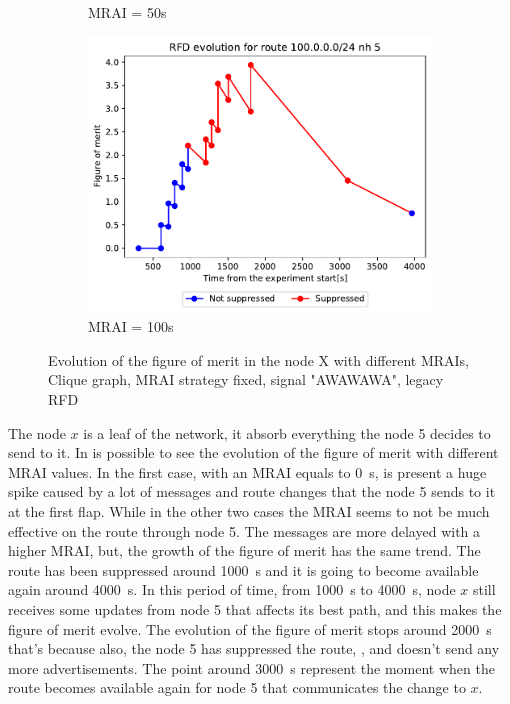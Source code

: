 \begin{figure}[h]
\begin{subfigure}[b]{0.49\textwidth}
         \caption{MRAI = 50s}
         \label{fig:clique_x_mrai50}
     \end{subfigure}
     \begin{subfigure}[b]{0.49\textwidth}
         \centering
         \includegraphics[width=\textwidth]{images/RFD/clique/FigureOfMerit/mrai21_RFD_x_rfd_R1.pdf}
         \caption{MRAI = 100s}
         \label{fig:clique_x_mrai100}
     \end{subfigure}
        \caption{Evolution of the figure of merit in the node X with different MRAIs,
		Clique graph, MRAI strategy fixed, signal "AWAWAWA", legacy RFD}
        \label{fig:clique_nodex}
\end{figure}

The node $x$ is a leaf of the network, it absorb everything the node \num{5} decides
to send to it.
In  is possible to see the evolution of the figure of merit
with different \ac{MRAI} values.
In the first case, with an \ac{MRAI} equals to \SI{0}{\second}, is present a huge
spike caused by a lot of messages and route changes that the node \num{5} sends
to it at the first flap.
While in the other two cases 
the \ac{MRAI} seems to not be much effective on the route through node \num{5}.
The messages are more delayed with a higher \ac{MRAI}, but, the growth of the figure
of merit has the same trend.
The route has been suppressed around \SI{1000}{\second}
and it is going to become available again around \SI{4000}{\second}.
In this period of time, from \SI{1000}{\second} to \SI{4000}{\second}, node $x$ still
receives some updates from node \num{5} that affects its best path, and this
makes the figure of merit evolve.
The evolution of the figure of merit stops around \SI{2000}{\second} that's because
also, the node \num{5} has suppressed the route, , and
doesn't send any more advertisements.
The point around \SI{3000}{\second} represent the moment when the route becomes
available again for node \num{5} that communicates the change to $x$.

